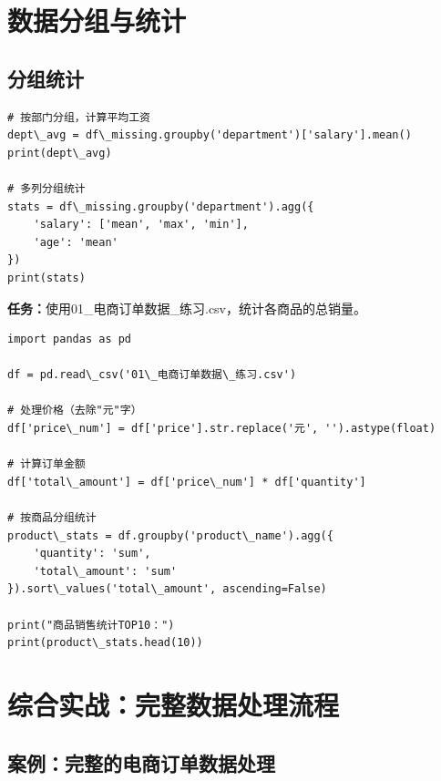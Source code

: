 \documentclass[12pt,a4paper]{article}
\begin{document}
\section{数据分组与统计}

\subsection{分组统计}

\begin{lstlisting}[caption={按部门统计工资}]
# 按部门分组，计算平均工资
dept\_avg = df\_missing.groupby('department')['salary'].mean()
print(dept\_avg)

# 多列分组统计
stats = df\_missing.groupby('department').agg({
    'salary': ['mean', 'max', 'min'],
    'age': 'mean'
})
print(stats)
\end{lstlisting}

\begin{practicebox}
\textbf{任务：}使用01\_电商订单数据\_练习.csv，统计各商品的总销量。

\begin{lstlisting}
import pandas as pd

df = pd.read\_csv('01\_电商订单数据\_练习.csv')

# 处理价格（去除"元"字）
df['price\_num'] = df['price'].str.replace('元', '').astype(float)

# 计算订单金额
df['total\_amount'] = df['price\_num'] * df['quantity']

# 按商品分组统计
product\_stats = df.groupby('product\_name').agg({
    'quantity': 'sum',
    'total\_amount': 'sum'
}).sort\_values('total\_amount', ascending=False)

print("商品销售统计TOP10：")
print(product\_stats.head(10))
\end{lstlisting}
\end{practicebox}

\section{综合实战：完整数据处理流程}

\subsection{案例：完整的电商订单数据处理}
\end{document}
